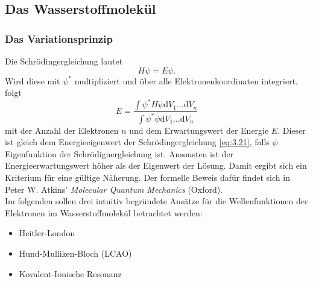 \setcounter{section}{3}
\setcounter{subsection}{2}
\setcounter{equation}{20}
\setcounter{figure}{6}

\subsection{Das Wasserstoffmolekül}
\subsubsection{Das Variationsprinzip}
	Die Schrödingergleichung lautet
	\begin{equation}
		\label{eq:3.21}
		H \psi = E \psi.
	\end{equation}
	Wird diese mit $ \psi^{*}$ multipliziert und über alle Elektronenkoordinaten integriert, folgt
	\begin{equation}
		\label{eq:3.22}
		E = \frac{ \int \psi^{*}H\psi \mathrm{d} V_1 \ldots \mathrm{d} V_n}{ \int \psi^{*} \psi \mathrm{d} V_1 \ldots\mathrm{d}V_{n}}
	\end{equation}
	mit der Anzahl der Elektronen $n$ und dem Erwartungswert der Energie $E$.
	Dieser ist gleich dem Energieeigenwert der Schrödingergleichung \eqref{eq:3.21}, falls $ \psi$ Eigenfunktion der Schrödignergleichung ist. 
	Ansonsten ist der Energieerwartungswert höher als der Eigenwert der Lösung. Damit ergibt sich ein Kriterium für eine gültige Näherung. 
	Der formelle Beweis dafür findet sich in Peter W. Atkins' \textit{Molecular Quantum Mechanics} (Oxford).\\

	Im folgenden sollen drei intuitiv begründete Ansätze für die Wellenfunktionen der Elektronen im Wasserstoffmolekül betrachtet werden:
	\begin{itemize}
		\item Heitler-London
		\item Hund-Mulliken-Bloch (LCAO) 
		\item Kovalent-Ionische Resonanz
	\end{itemize}

